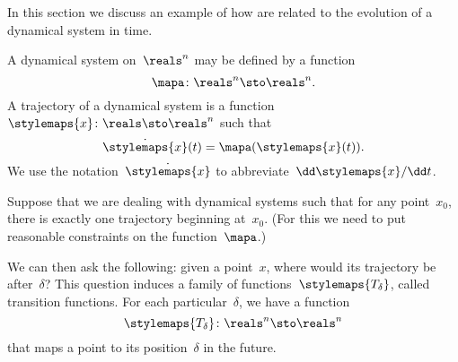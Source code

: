In this section we discuss an example of how  are related to the evolution of a dynamical system in time.

\label{exa:transition-functions}
\begin{definition}
    \label{def:ct-dynsyst}
    A dynamical system on~$\reals^n$ may be defined by a function
    \begin{equation}
        \mapa \colon \reals^n \sto \reals^n.
    \end{equation}
    A trajectory of a dynamical system is a function~$\stylemaps{x}\colon \reals \sto \reals^n$ such that
    \begin{equation}
        \dot{\stylemaps{x}}(t) = \mapa(\stylemaps{x}(t)).
    \end{equation}
    We use the notation~$\dot{\stylemaps{x}}$ to abbreviate~$\dd \stylemaps{x} / \dd t$.
\end{definition}

Suppose that we are dealing with dynamical systems such that for any point~$x_0$, there is exactly one trajectory beginning at~$x_0$.
(For this we need to put reasonable constraints on the function~$\mapa$.)

We can then ask the following: given a point~$x$, where would its trajectory be after~$\delta$?
This question induces a family of functions~$\stylemaps{T_\delta}$, called transition functions.
For each particular~$\delta$, we have a function
\begin{equation}
    \stylemaps{T_{\delta}}\colon \reals^n \sto  \reals^n
\end{equation}
that maps a point to its position~$\delta$ in the future.

